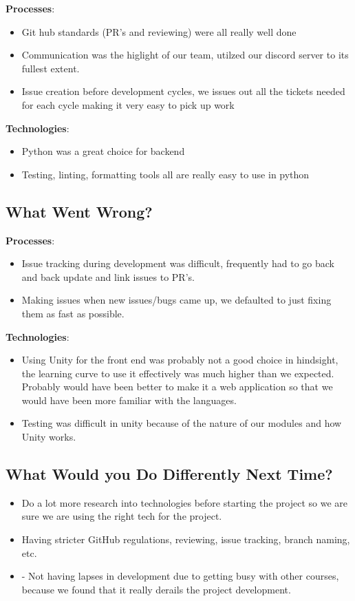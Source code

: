 \documentclass{article}
\begin{document}
\noindent \textbf{Processes}:
\begin{itemize}
    \item Git hub standards (PR’s and reviewing) were all really well done
    \item Communication was the higlight of our team, utilzed our discord server to its fullest extent.
    \item Issue creation before development cycles, we issues out all the tickets needed for each cycle making it very easy to pick up work
\end{itemize}

\noindent \textbf{Technologies}:
\begin{itemize}
    \item Python was a great choice for backend
    \item Testing, linting, formatting tools all are really easy to use in python
\end{itemize}

\subsection{What Went Wrong?}
\noindent \textbf{Processes}:
\begin{itemize}
    \item Issue tracking during development was difficult, frequently had to go back and back update and link issues to PR’s.
    \item Making issues when new issues/bugs came up, we defaulted to just fixing them as fast as possible.
\end{itemize}

\noindent \textbf{Technologies}:
\begin{itemize}
    \item Using Unity for the front end was probably not a good choice in hindsight, the learning curve to use it effectively was much higher than we expected. Probably would have been better to make it a web application so that we would have been more familiar with the languages.
    \item Testing was difficult in unity because of the nature of our modules and how Unity works.
\end{itemize}

\subsection{What Would you Do Differently Next Time?}

\begin{itemize}
    \item Do a lot more research into technologies before starting the project so we are sure we are using the right tech for the project.
    \item Having stricter GitHub regulations, reviewing, issue tracking, branch naming, etc.
    \item -	Not having lapses in development due to getting busy with other courses, because we found that it really derails the project development.
\end{itemize}
\end{document}
